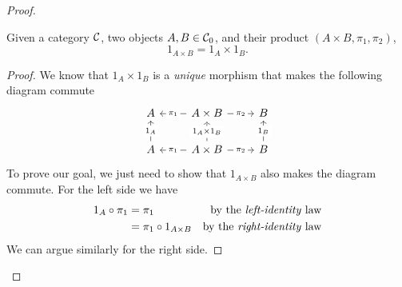 \begin{solution}
\begin{proof}
			\begin{lemma}
				\label{lem:id-id}
				Given a category $\mathcal{C}$, two objects $A, B \in \mathcal{C}_0$, and their product $(A \times B, \pi_1, \pi_2)$,
        \[
					1_{A \times B} = 1_A \times 1_B.
				\]
			\end{lemma}
			\begin{proof}
				We know that $1_A \times 1_B$ is a \textit{unique} morphism that makes the following diagram commute
				\[
					\begin{tikzcd}
						A & {A \times B} & B \\
						A & {A \times B} & B
						\arrow["{\pi_1}"{description}, from=1-2, to=1-1]
						\arrow["{\pi_2}"{description}, from=1-2, to=1-3]
						\arrow["{1_A \times 1_B}"{description}, dashed, from=2-2, to=1-2]
						\arrow["{1_B}"{description}, from=2-3, to=1-3]
						\arrow["{1_A}"{description}, from=2-1, to=1-1]
						\arrow["{\pi_1}"{description}, from=2-2, to=2-1]
						\arrow["{\pi_2}"{description}, from=2-2, to=2-3]
					\end{tikzcd}
				\]
				To prove our goal, we just need to show that $1_{A \times B}$ also makes the diagram commute.
				For the left side we have
				\begin{align*}
					1_A \circ \pi_1 & = \pi_1                      & \text{by the \textit{left-identity} law}  \\
					                & = \pi_1 \circ 1_{A \times B} & \text{by the \textit{right-identity} law}
				\end{align*}
				We can argue similarly for the right side.
			\end{proof}


\end{proof}
\end{solution}
